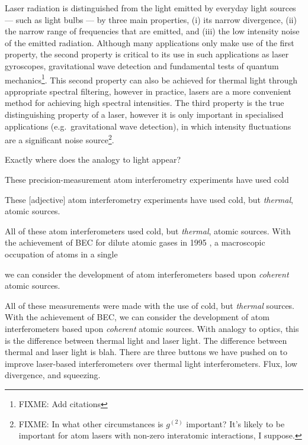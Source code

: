Laser radiation is distinguished from the light emitted by everyday light sources --- such as light bulbs --- by three main properties, (i) its narrow divergence, (ii) the narrow range of frequencies that are emitted, and (iii) the low intensity noise of the emitted radiation.  Although many applications only make use of the first property, the second property is critical to its use in such applications as laser gyroscopes, gravitational wave detection and fundamental tests of quantum mechanics\footnote{FIXME: Add citations}.  This second property can also be achieved for thermal light through appropriate spectral filtering, however in practice, lasers are a more convenient method for achieving high spectral intensities.  The third property is the true distinguishing property of a laser, however it is only important in specialised applications (e.g.\ gravitational wave detection), in which intensity fluctuations are a significant noise source\footnote{FIXME: In what other circumstances is $g^{(2)}$ important?  It's likely to be important for atom lasers with non-zero interatomic interactions, I suppose.}.




Exactly where does the analogy to light appear?  


These precision-measurement atom interferometry experiments have used cold


These [adjective] atom interferometry experiments have used cold, but \emph{thermal}, atomic sources.


All of these atom interferometers used cold, but \emph{thermal}, atomic sources.  With the achievement of BEC for dilute atomic gases in 1995 \citep{Anderson:1995vn,Bradley:1995ys,Davis:1995}, a macroscopic occupation of atoms in a single 

we can consider the development of atom interferometers based upon \emph{coherent} atomic sources.





All of these measurements were made with the use of cold, but \emph{thermal} sources.  With the achievement of BEC, we can consider the development of atom interferometers based upon \emph{coherent} atomic sources.  With analogy to optics, this is the difference between thermal light and laser light.  The difference between thermal and laser light is blah.  There are three buttons we have pushed on to improve laser-based interferometers over thermal light interferometers.  Flux, low divergence, and squeezing.  



